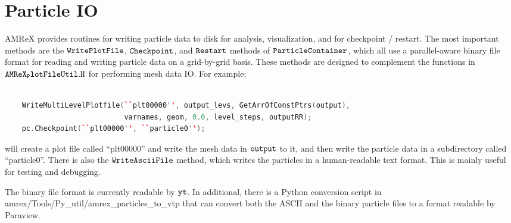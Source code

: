 \section{Particle IO}
\label{sec:Particles:IO}

AMReX provides routines for writing particle data to disk for analysis, visualization, and for checkpoint / restart. The most important methods are the $\tt{WritePlotFile}$, $\tt{Checkpoint}$, and $\tt{Restart}$ methods of $\tt{ParticleContainer}$, which all use a parallel-aware binary file format for reading and writing particle data on a grid-by-grid basis. These methods are designed to complement the functions in $\tt{AMReX_PlotFileUtil.H}$ for performing mesh data IO. For example:

\begin{lstlisting}[language=cpp]

    WriteMultiLevelPlotfile(``plt00000'', output_levs, GetArrOfConstPtrs(output),
                            varnames, geom, 0.0, level_steps, outputRR);
    pc.Checkpoint(``plt00000'', ``particle0'');

\end{lstlisting}

will create a plot file called ``plt00000'' and write the mesh data in $\tt{output}$ to it, and then write the particle data in a subdirectory called ``particle0''. There is also the $\tt{WriteAsciiFile}$ method, which writes the particles in a human-readable text format. This is mainly useful for testing and debugging.

The binary file format is currently readable by $\tt{yt}$. In additional, there is a Python conversion script in amrex/Tools/Py\_util/amrex\_particles\_to\_vtp that can convert both the ASCII and the binary particle files to a format readable by Paraview. 
